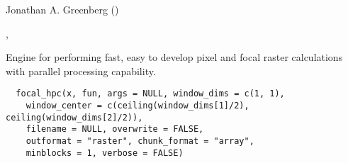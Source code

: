 \documentclass[a4paper]{book}
\begin{document}
%
\begin{Author}\relax
Jonathan A. Greenberg
()
\end{Author}
%
\begin{SeeAlso}\relax
{},
\end{SeeAlso}
%
\begin{Description}\relax
Engine for performing fast, easy to develop pixel and
focal raster calculations with parallel processing
capability.
\end{Description}
%
\begin{Usage}
\begin{verbatim}
  focal_hpc(x, fun, args = NULL, window_dims = c(1, 1),
    window_center = c(ceiling(window_dims[1]/2), ceiling(window_dims[2]/2)),
    filename = NULL, overwrite = FALSE,
    outformat = "raster", chunk_format = "array",
    minblocks = 1, verbose = FALSE)
\end{verbatim}
\end{Usage}
%
\end{document}
